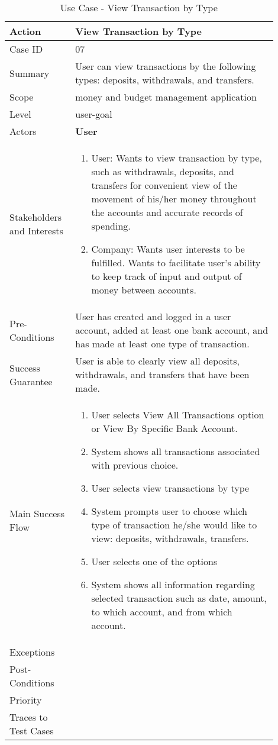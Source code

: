 \documentclass[11pt]{article}
\newcounter{use case ID}
\newcommand\tabularhead[1]{
\begin{table}[ht]
    \addtocounter{use case ID}{1}
    \caption{Use Case \arabic{use case ID} - #1}
    \vspace{0.2cm}
    \begin{tabular}{|p{0.2\linewidth}|p{0.70\linewidth}|}
    \hline
        \textbf{Action} & \textbf{#1} \\
        \hline}
\newcommand\addrow[2]{#1 & #2\\ \hline}
\newcommand\addmulrow[2]{ \begin{minipage}[t][][t]{2.5cm}#1\end{minipage}
        &\begin{minipage}[t][][t]{11cm}
        \begin{enumerate}[itemsep=-1ex] #2   \end{enumerate}
    \end{minipage}\vfill\\ \hline}
\newenvironment{usecase}{\tabularhead}
{\hline\end{tabular}\end{table}}
\begin{document}
\begin{usecase}{View Transaction by Type}
    \addrow{Case ID}{07}
    \addrow{Summary}{User can view transactions by the following types: deposits, withdrawals, and transfers. }
    \addrow{Scope}{money and budget management application}
    \addrow{Level}{user-goal}
    \addrow{Actors}{\textbf{User}}
    \addmulrow{Stakeholders and Interests}{
        \item User: Wants to view transaction by type, such as withdrawals, deposits, and transfers for convenient view of the movement of his/her money throughout the accounts and accurate records of spending.
        \item Company: Wants user interests to be fulfilled. Wants to facilitate user's ability to keep track of input and output of money between accounts.}
    \addrow{Pre-Conditions}{User has created and logged in a user account, added at least one bank account, and has made at least one type of transaction.}
    \addrow{Success Guarantee}{User is able to clearly view all deposits, withdrawals, and transfers that have been made.}
    \addmulrow{Main Success Flow}{
        \item User selects View All Transactions option or View By Specific Bank Account.
        \item System shows all transactions associated with previous choice.
        \item User selects view transactions by type
        \item System prompts user to choose which type of transaction he/she would like to view: deposits, withdrawals, transfers.
        \item User selects one of the options
        \item System shows all information regarding selected transaction such as date, amount, to which account, and from which account.}
    \addrow{Exceptions}{}
    \addrow{Post-Conditions}{}
    \addrow{Priority}{}
    \addrow{Traces to Test Cases}{}
\end{usecase}
\end{document}
